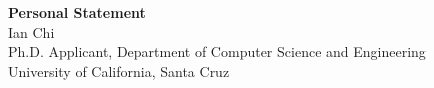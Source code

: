 \documentclass[11pt]{article}
\begin{document}
\begin{center}
    {\Large \textbf{Personal Statement}}\\[4pt]
    {\large Ian Chi}\\[2pt]
    Ph.D. Applicant, Department of Computer Science and Engineering\\
    University of California, Santa Cruz
\end{center}

\vspace{1em}

\end{document}
